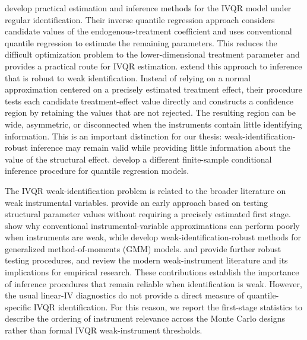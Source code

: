 \textcite{chernozhukov_hansen_2006} develop practical estimation and inference methods for the IVQR model under regular identification. Their inverse quantile regression approach considers candidate values of the endogenous-treatment coefficient and uses conventional quantile regression to estimate the remaining parameters. This reduces the difficult optimization problem to the lower-dimensional treatment parameter and provides a practical route for IVQR estimation. \textcite{chernozhukov_hansen_2008} extend this approach to inference that is robust to weak identification. Instead of relying on a normal approximation centered on a precisely estimated treatment effect, their procedure tests each candidate treatment-effect value directly and constructs a confidence region by retaining the values that are not rejected. The resulting region can be wide, asymmetric, or disconnected when the instruments contain little identifying information. This is an important distinction for our thesis: weak-identification-robust inference may remain valid while providing little information about the value of the structural effect. \textcite{chernozhukov_hansen_jansson_2009} develop a different finite-sample conditional inference procedure for quantile regression models.

The IVQR weak-identification problem is related to the broader literature on weak instrumental variables. \textcite{anderson_rubin_1949} provide an early approach based on testing structural parameter values without requiring a precisely estimated first stage. \textcite{staiger_stock_1997} show why conventional instrumental-variable approximations can perform poorly when instruments are weak, while \textcite{stock_wright_2000} develop weak-identification-robust methods for generalized method-of-moments (GMM) models. \textcite{kleibergen_2002} and \textcite{moreira_2003} provide further robust testing procedures, and \textcite{andrews_stock_sun_2019} review the modern weak-instrument literature and its implications for empirical research. These contributions establish the importance of inference procedures that remain reliable when identification is weak. However, the usual linear-IV diagnostics do not provide a direct measure of quantile-specific IVQR identification. For this reason, we report the first-stage statistics to describe the ordering of instrument relevance across the Monte Carlo designs rather than formal IVQR weak-instrument thresholds.

